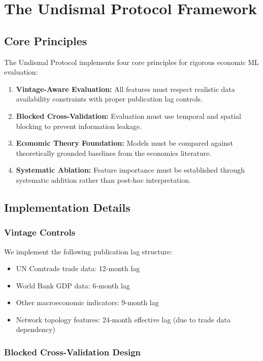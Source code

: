 \documentclass[11pt,a4paper]{article}
\begin{document}
\section{The Undismal Protocol Framework}

\subsection{Core Principles}

The Undismal Protocol implements four core principles for rigorous economic ML evaluation:

\begin{enumerate}
\item \textbf{Vintage-Aware Evaluation:} All features must respect realistic data availability constraints with proper publication lag controls.
\item \textbf{Blocked Cross-Validation:} Evaluation must use temporal and spatial blocking to prevent information leakage.
\item \textbf{Economic Theory Foundation:} Models must be compared against theoretically grounded baselines from the economics literature.
\item \textbf{Systematic Ablation:} Feature importance must be established through systematic addition rather than post-hoc interpretation.
\end{enumerate}

\subsection{Implementation Details}

\subsubsection{Vintage Controls}

We implement the following publication lag structure:
\begin{itemize}
\item UN Comtrade trade data: 12-month lag
\item World Bank GDP data: 6-month lag
\item Other macroeconomic indicators: 9-month lag
\item Network topology features: 24-month effective lag (due to trade data dependency)
\end{itemize}

\subsubsection{Blocked Cross-Validation Design}
\end{document}
